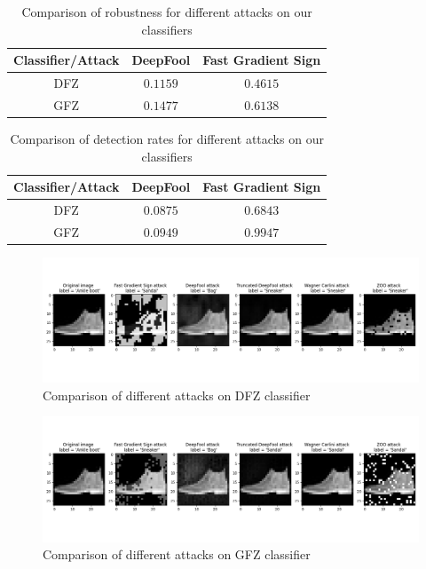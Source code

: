 \documentclass[10pt,twocolumn,letterpaper]{article}
\begin{document}
\begin{table}[ht]
    \centering
    \begin{tabular}{|c|c|c|}
        \hline
        \textbf{Classifier/Attack} & \textbf{DeepFool} & \textbf{Fast Gradient Sign} \\
        \hline
        DFZ & $0.1159$ & $0.4615$ \\
        \hline
        GFZ & $0.1477$ & $0.6138$ \\
        \hline
    \end{tabular}
    \caption{Comparison of robustness for different attacks on our classifiers}
    \label{tab:perturbation_norms}
\end{table}

\begin{table}[ht]
    \centering
    \begin{tabular}{|c|c|c|}
        \hline
        \textbf{Classifier/Attack} & \textbf{DeepFool} & \textbf{Fast Gradient Sign} \\
        \hline
        DFZ & $0.0875$ & $0.6843$ \\
        \hline
        GFZ & $0.0949$ & $0.9947$ \\
        \hline
    \end{tabular}
    \caption{Comparison of detection rates for different attacks on our classifiers}
    \label{tab:detection_rates}
\end{table}

\begin{figure}[ht]
    \centering
    \includegraphics[width=\textwidth]{illustrations/attacks_sample_dfz.png}
    \caption{Comparison of different attacks on DFZ classifier}
    \label{fig:attacks_sample_dfz}
\end{figure}

\begin{figure}[ht]
    \centering
    \includegraphics[width=\textwidth]{illustrations/attacks_sample_gfz.png}
    \caption{Comparison of different attacks on GFZ classifier}
    \label{fig:attacks_sample_gfz}
\end{figure}
\end{document}
